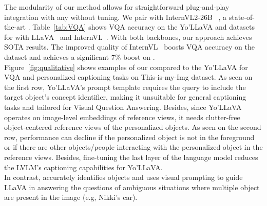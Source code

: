  The modularity of our method allows for straightforward plug-and-play integration with any \VLM without tuning. We pair \ours with InternVL2-26B~\cite{chen2024internvl} , a state-of-the-art \VLM. Table~\ref{tab:VQA} shows VQA accuracy on the Yo’LLaVA and \thisismy datasets for \ours with LLaVA~\cite{liu2024improved} and InternVL~\cite{chen2024internvl}. With both backbones, our approach achieves SOTA results. The improved quality of InternVL~\cite{chen2024internvl}  boosts VQA accuracy on the \yollava dataset and achieves a significant   $7\%$ boost on \thisismy. \\
Figure~\ref{fig:qualitative} shows examples of our \ours compared to the Yo’LLaVA for VQA and personalized captioning tasks on This-is-my-Img dataset. As seen on the first row, Yo'LLaVA's prompt template requires the query to include the target object’s concept identifier, making it unsuitable for general captioning tasks and tailored for Visual Question Answering. Besides, since Yo’LLaVA operates on image-level embeddings of reference views, it needs clutter-free object-centered reference views of the personalized objects. As seen on the second row, performance can decline if the personalized object is not in the foreground or if there are other objects/people interacting with the personalized object in the reference views. Besides, fine-tuning the last layer of the language model reduces the LVLM’s captioning capabilities for Yo'LLaVA. \\
In contrast, \ours accurately identifies objects and uses visual prompting to guide LLaVA in answering the questions of ambiguous situations where multiple object are present in the image (e.g, Nikki's car). %